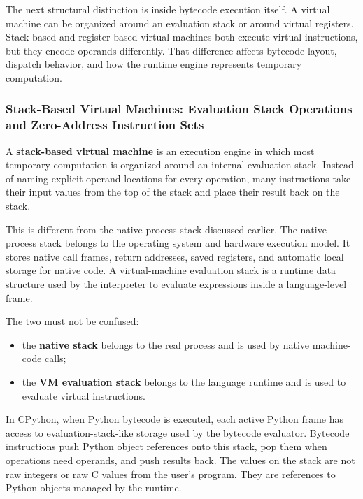 \documentclass[a4paper,twoside]{report}
\begin{document}
The next structural distinction is inside bytecode execution itself. A virtual machine can be organized around an evaluation stack or around virtual registers. Stack-based and register-based virtual machines both execute virtual instructions, but they encode operands differently. That difference affects bytecode layout, dispatch behavior, and how the runtime engine represents temporary computation.





\subsubsection{Stack-Based Virtual Machines: Evaluation Stack Operations and Zero-Address Instruction Sets}

A \textbf{stack-based virtual machine} is an execution engine in which most temporary computation is organized around an internal evaluation stack. Instead of naming explicit operand locations for every operation, many instructions take their input values from the top of the stack and place their result back on the stack.

This is different from the native process stack discussed earlier. The native process stack belongs to the operating system and hardware execution model. It stores native call frames, return addresses, saved registers, and automatic local storage for native code. A virtual-machine evaluation stack is a runtime data structure used by the interpreter to evaluate expressions inside a language-level frame.

The two must not be confused:

\begin{itemize}
    \item the \textbf{native stack} belongs to the real process and is used by native machine-code calls;
    \item the \textbf{VM evaluation stack} belongs to the language runtime and is used to evaluate virtual instructions.
\end{itemize}

In CPython, when Python bytecode is executed, each active Python frame has access to evaluation-stack-like storage used by the bytecode evaluator. Bytecode instructions push Python object references onto this stack, pop them when operations need operands, and push results back. The values on the stack are not raw integers or raw C values from the user's program. They are references to Python objects managed by the runtime.
\end{document}
